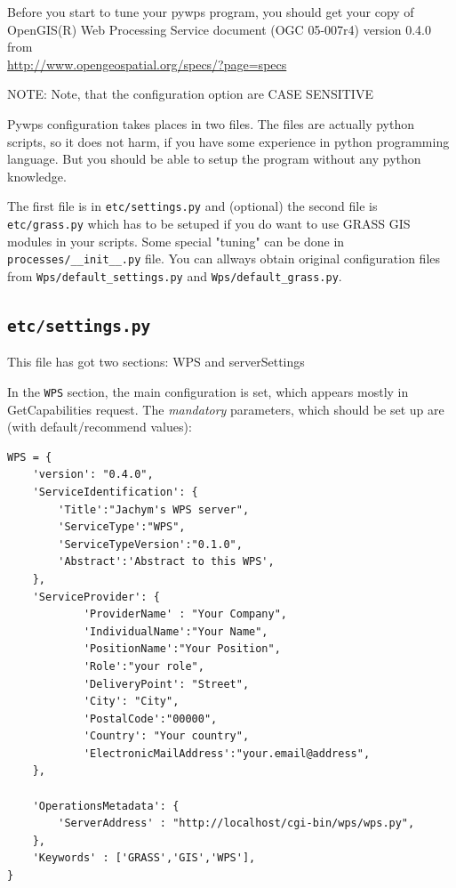 \documentclass[a4paper,11pt]{article}
\newcommand{\note}[1]{\medskip{}\noindent{}NOTE: #1\medskip{}}
\begin{document}
Before you start to tune your pywps program, you should get your copy of
OpenGIS(R) Web Processing Service document (OGC 05-007r4) version 0.4.0
from\\ \url{http://www.opengeospatial.org/specs/?page=specs}
    
\note{Note, that the configuration option are CASE SENSITIVE}
    
Pywps configuration takes places in two files. The files are actually python
scripts, so it does not harm, if you have some experience in python
programming language. But you should be able to setup the program without
any python knowledge.

The first file is in \texttt{etc/settings.py} and (optional) the second file is
\texttt{etc/grass.py} which has to be setuped if you do want to use
GRASS GIS modules in your scripts. Some special "tuning" can be done in \texttt{processes/\_\_init\_\_.py}
file. You can allways obtain original configuration files from
\texttt{Wps/default\_settings.py} and \texttt{Wps/default\_grass.py}.
    
\subsection{\texttt{etc/settings.py}}
    
This file has got two sections: WPS and serverSettings
    
In the \texttt{WPS} section, the main configuration is set, which appears mostly in
GetCapabilities request. The \emph{mandatory} parameters, which should be set up
are (with default/recommend values):
    

\begin{verbatim}
WPS = {
    'version': "0.4.0",
    'ServiceIdentification': {
        'Title':"Jachym's WPS server",
        'ServiceType':"WPS",
        'ServiceTypeVersion':"0.1.0",
        'Abstract':'Abstract to this WPS',
    },
    'ServiceProvider': {
            'ProviderName' : "Your Company",
            'IndividualName':"Your Name",
            'PositionName':"Your Position",
            'Role':"your role",
            'DeliveryPoint': "Street",
            'City': "City",
            'PostalCode':"00000",
            'Country': "Your country",
            'ElectronicMailAddress':"your.email@address",
    },

    'OperationsMetadata': {
        'ServerAddress' : "http://localhost/cgi-bin/wps/wps.py",
    },
    'Keywords' : ['GRASS','GIS','WPS'],
}
\end{verbatim}
\end{document}
